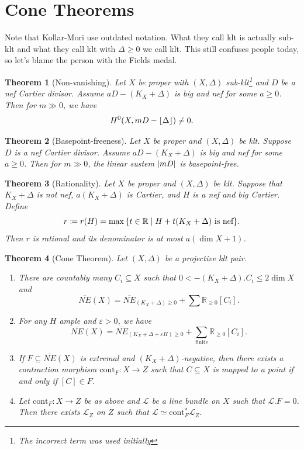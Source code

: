 \documentclass[leqno, openany]{memoir}
\DeclarePairedDelimiter{\floor}{\lfloor}{\rfloor}
\newtheorem{thm}{Theorem}[section]
\theoremstyle{definition}
\theoremstyle{remark}
\theoremstyle{plain}
\theoremstyle{definition}
\theoremstyle{remark}
\newcommand{\R}{\mathbb{R}}
\newcommand{\ep}{\varepsilon}
\newcommand{\msc}[1]{\mathscr{#1}}
\newcommand{\mr}[1]{\mathrm{#1}}
\newcommand{\ol}[1]{\overline{#1}}
\begin{document}
\section{Cone Theorems}%
\label{sec:cone_theorems}

Note that Kollar-Mori use outdated notation. What they call klt is actually sub-klt and what they call klt with $\Delta \geq 0$ we call klt. This still confuses people today, so let's blame the person with the Fields medal.

\begin{thm}[Non-vanishing]
    Let $X$ be proper with $(X, \Delta)$ sub-klt\footnote{The incorrect term was used initially} and $D$ be a nef Cartier divisor. Assume $aD - (K_X + \Delta)$ is big and nef for some $a \geq 0$. Then for $m \gg 0$, we have
    \[ H^0(X, mD - \floor{\Delta}) \neq 0. \]
\end{thm}

\begin{thm}[Basepoint-freeness]
    Let $X$ be proper and $(X, \Delta)$ be klt. Suppose $D$ is a nef Cartier divisor. Assume $aD - (K_X + \Delta)$ is big and nef for some $a \geq 0$. Then for $m \gg 0$, the linear sustem $\abs{mD}$ is basepoint-free.
\end{thm}

\begin{thm}[Rationality]
    Let $X$ be proper and $(X, \Delta)$ be klt. Suppose that $K_X + \Delta$ is not nef, $a(K_X + \Delta)$ is Cartier, and $H$ is a nef and big Cartier. Define
    \[ r \coloneqq r(H) = \max \qty{t \in \R \mid H + t(K_X + \Delta)\ \text{is nef}}. \]
    Then $r$ is rational and its denominator is at most $a(\dim X + 1)$.
\end{thm}

\begin{thm}[Cone Theorem]
    Let $(X, \Delta)$ be a projective klt pair. 
    \begin{enumerate}
        \item There are countably many $C_i \subseteq X$ such that $0 < - (K_X + \Delta) . C_i \leq 2 \dim X$ and
            \[ \ol{NE}(X) = \ol{NE}_{(K_X + \Delta) \geq 0} + \sum \R_{\geq 0} [C_i]. \]
        \item For any $H$ ample and $\ep > 0$, we have
            \[ \ol{NE}(X) = \ol{NE}_{(K_X + \Delta + \ep H) \geq 0} + \sum_{\text{finite}} \R_{\geq 0} [C_i]. \]
        \item If $F \subseteq \ol{NE}(X)$ is extremal and $(K_X + \Delta)$-negative, then there exists a contraction morphism $\mr{cont}_F \colon X \to Z$ such that $C \subseteq X$ is mapped to a point if and only if $[C] \in F$.
        \item Let $\mr{cont}_F \colon X \to Z$ be as above and $\msc{L}$ be a line bundle on $X$ such that $\msc{L}.F = 0$. Then there exists $\msc{L}_Z$ on $Z$ such that $\msc{L} \simeq \mr{cont}_F^* \msc{L}_Z$.
    \end{enumerate}
\end{thm}
\end{document}
